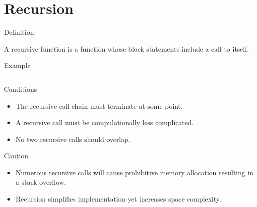 \documentclass[compress]{beamer}
\begin{document}
\prepareCover

\section{Recursion}

\begin{slide}
	\begin{block}{Definition}

	A recursive function is a function whose block statements include a call to itself.

	\end{block}
\end{slide}

\begin{slide}
	\begin{block}{Example}

	\inputminted[fontsize=\scriptsize, firstline=10, linenos]{c}{
		\resDirectory/ls08-hellos.c
	}

	\end{block}
\end{slide}

\begin{slide}
	\begin{block}{Conditions}

	\begin{itemize}
	\item[] The recursive call chain must terminate at some point.
	\item[] A recursive call must be compulationally less complicated.
	\item[] No two recursive calls should overlap.
	\end{itemize}

	\end{block}
\end{slide}

\begin{slide}
	\begin{block}{Caution}

	\begin{itemize}
	\item[] Numerous recursive calls will cause prohibitive memory allocation resulting in a stack overflow.
	\item[] Recursion simplifies implementation yet increases space complexity.
	\end{itemize}

	\end{block}
\end{slide}
\end{document}
